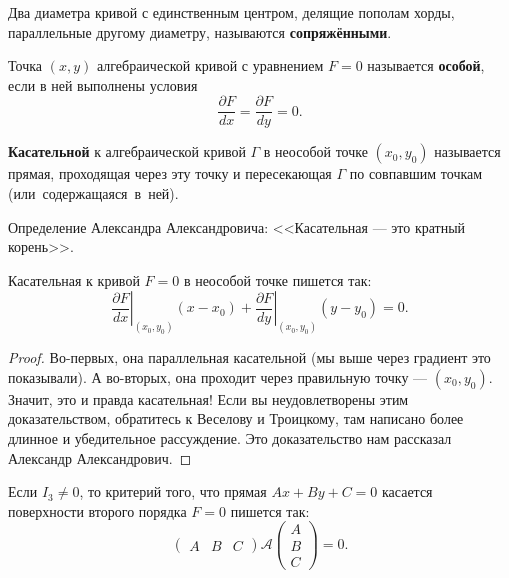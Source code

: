 \begin{definition}
    Два диаметра кривой с единственным центром, делящие пополам хорды, параллельные другому диаметру, называются \textbf{сопряжёнными}.
\end{definition}

\begin{definition}
    Точка $(x, y)$ алгебраической кривой с уравнением $F = 0$ называется \textbf{особой}, если в ней выполнены условия
    $$
    \frac{\partial F}{dx} = \frac{\partial F}{dy} = 0.
    $$
\end{definition}

\begin{definition}
    \textbf{Касательной} к алгебраической кривой $\Gamma$ в неособой точке $(x_0, y_0)$ называется прямая, проходящая через эту точку и пересекающая $\Gamma$ по совпавшим точкам \mbox{(или содержащаяся в ней)}.
\end{definition}

\begin{orangebox}
    Определение Александра Александровича: <<Касательная --- это кратный корень>>.
\end{orangebox}

\begin{theorem}
    Касательная к кривой $F = 0$ в неособой точке пишется так:
    $$
    \left.\frac{\partial F}{dx}\right|_{(x_0, y_0)}(x - x_0) + 
    \left.\frac{\partial F}{dy}\right|_{(x_0, y_0)}(y - y_0) = 0.
    $$
\end{theorem}

\begin{proof}
    Во-первых, она параллельная касательной (мы выше через градиент это показывали). А во-вторых, она проходит через правильную точку --- $(x_0, y_0)$. Значит, это и правда касательная! Если вы неудовлетворены этим доказательством, обратитесь к Веселову и Троицкому, там написано более длинное и убедительное рассуждение. Это доказательство нам рассказал Александр Александрович.
\end{proof}

\begin{theorem}
    Если $I_3 \ne 0$, то критерий того, что прямая $Ax + By + C = 0$ касается поверхности второго порядка $F = 0$ пишется так:
    $$
    \begin{pmatrix}
        A & B & C
    \end{pmatrix}\mathcal{A}
    \begin{pmatrix}
        A\\ B\\ C
    \end{pmatrix} = 0.
    $$
\end{theorem}

